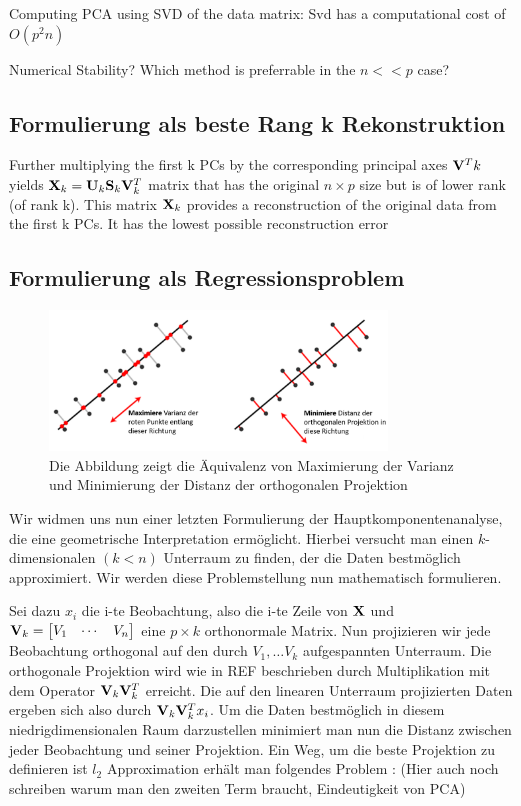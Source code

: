 Computing PCA using SVD of the data matrix:
Svd has a computational cost of $O(p^2n)$

Numerical Stability? Which method is preferrable in the $n << p$ case?


\subsection{Formulierung als beste Rang k Rekonstruktion}
Further multiplying the first k PCs by the corresponding principal axes $\mathbf{V}^T k$ yields $\mathbf{X}_k = \mathbf{U}_k \mathbf{S}_k \mathbf{V}_k^T$ matrix that has the original $n \times p$ size but is of lower rank (of rank k). This matrix $\mathbf{X}_k$ provides a reconstruction of the original data from the first k PCs. It has the lowest possible reconstruction error


\subsection{Formulierung als Regressionsproblem}

\begin{figure}
\centering
\includegraphics[width = 0.8\textwidth]{figures/pca_projection_explanation_german.png}
\caption{Die Abbildung zeigt die Äquivalenz von Maximierung der Varianz und Minimierung der Distanz der orthogonalen Projektion}
\label{pca_projection_explanation}
\end{figure}

Wir widmen uns nun einer letzten Formulierung der Hauptkomponentenanalyse, die eine geometrische Interpretation ermöglicht. Hierbei versucht man einen $k$-dimensionalen $(k < n)$ Unterraum zu finden, der die Daten bestmöglich approximiert. Wir werden diese Problemstellung nun mathematisch formulieren.

Sei dazu $x_i$ die i-te Beobachtung, also die i-te Zeile von $\mathbf{X}$ und $\mathbf{V}_k = \begin{bmatrix} V_1 & \cdots & V_n \end{bmatrix}$ eine $p \times k$ orthonormale Matrix. Nun projizieren wir jede Beobachtung orthogonal auf den durch $V_1, \ldots V_k$ aufgespannten Unterraum. Die orthogonale Projektion wird wie in REF beschrieben durch Multiplikation mit dem Operator $\mathbf{V}_k \mathbf{V}_k^T$ erreicht. Die auf den linearen Unterraum projizierten Daten ergeben sich also durch $\mathbf{V}_k \mathbf{V}_k^T x_i$. Um die Daten bestmöglich in diesem niedrigdimensionalen Raum darzustellen minimiert man nun die Distanz zwischen jeder Beobachtung und seiner Projektion. Ein Weg, um die beste Projektion zu definieren ist $l_2$ Approximation erhält man folgendes Problem \cite{zou_sparsepca}: (Hier auch noch schreiben warum man den zweiten Term braucht, Eindeutigkeit von PCA)

